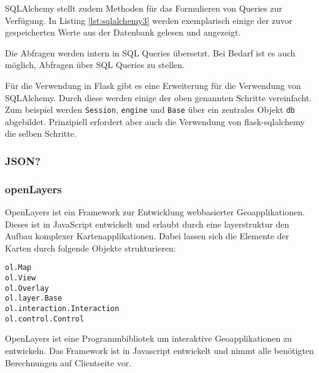     
    SQLAlchemy stellt zudem Methoden für das Formulieren von Queries zur Verfügung. In Listing \ref{lst:sqlalchemy3} werden exemplarisch einige der zuvor gespeicherten Werte aus der Datenbank gelesen und angezeigt.
    
    Die Abfragen werden intern in SQL Queries übersetzt. Bei Bedarf ist es auch möglich, Abfragen über SQL Queries zu stellen.
    
    
    
    
    
    Für die Verwendung in Flask gibt es eine Erweiterung für die Verwendung von SQLAlchemy. Durch diese werden einige der oben genannten Schritte vereinfacht. Zum beispiel werden \texttt{Session}, \texttt{engine} und \texttt{Base} über ein zentrales Objekt \texttt{db} abgebildet. Prinzipiell erfordert aber auch die Verwendung von flask-sqlalchemy die selben Schritte.
    
    
    \subsubsection{JSON?}

    \subsubsection{openLayers}
    
    OpenLayers ist ein Framework zur Entwicklung webbasierter Geoapplikationen. Dieses ist in JavaScript entwickelt und erlaubt durch eine layerstruktur den Aufbau komplexer Kartenapplikationen. Dabei lassen sich die Elemente der Karten durch folgende Objekte strukturieren:
    
    \begin{description}
     \item [\texttt{ol.Map}]  
     \item [\texttt{ol.View}] 
     \item [\texttt{ol.Overlay}]
     \item [\texttt{ol.layer.Base}]
     \item [\texttt{ol.interaction.Interaction}]
     \item [\texttt{ol.control.Control}]
    \end{description}

    
    OpenLayers ist eine Programmbibliotek um interaktive Geoapplikationen zu entwickeln. Das Framework ist in Javascript entwickelt und nimmt alle benötigten Berechnungen auf Clientseite vor.
    
